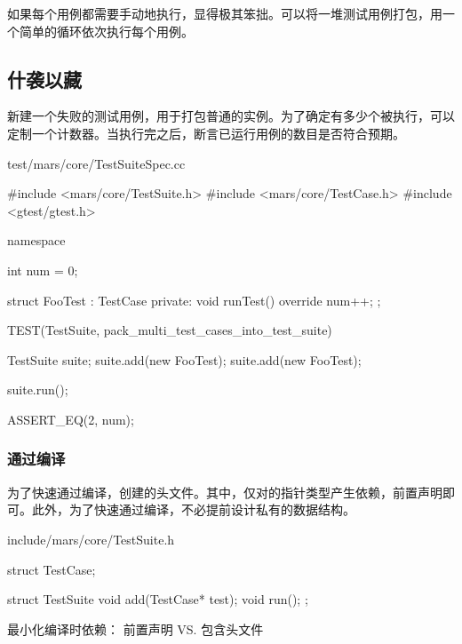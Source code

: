 \begin{content}

如果每个用例都需要手动地执行，显得极其笨拙。可以将一堆测试用例打包，用一个简单的循环依次执行每个用例。

\subsection{什袭以藏}

新建一个失败的测试用例，用于打包普通的实例。为了确定有多少个被执行，可以定制一个计数器。当执行完之后，断言已运行用例的数目是否符合预期。

\begin{nodiff}{test/mars/core/TestSuiteSpec.cc}
 \begin{c++}
#include <mars/core/TestSuite.h>
#include <mars/core/TestCase.h>
#include <gtest/gtest.h>

namespace {
  int num = 0;

  struct FooTest : TestCase {
  private:
    void runTest() override {
      num++;
    }
  };
}

TEST(TestSuite, pack_multi_test_cases_into_test_suite) {
  TestSuite suite;
  suite.add(new FooTest);
  suite.add(new FooTest);

  suite.run();

  ASSERT_EQ(2, num);
}
 \end{c++}
\end{nodiff}

\subsubsection{通过编译}

为了快速通过编译，创建的头文件。其中，仅对的指针类型产生依赖，前置声明即可。此外，为了快速通过编译，不必提前设计私有的数据结构。

\begin{nodiff}{include/mars/core/TestSuite.h}
 \begin{c++}
struct TestCase;

struct TestSuite {
  void add(TestCase* test);
  void run();
};
 \end{c++}
\end{nodiff}

\begin{episode}{最小化编译时依赖： 前置声明 VS. 包含头文件}

\begin{content}


\end{content}
\end{episode}
\end{content}
